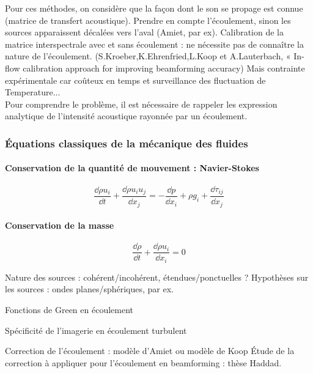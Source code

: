 Pour ces méthodes, on considère que la façon dont le son se propage est connue (matrice de transfert acoustique). Prendre en compte l'écoulement, sinon les sources apparaissent décalées vers l'aval (Amiet, par ex). 
Calibration de la matrice interspectrale avec et sans écoulement : ne nécessite pas de connaître la nature de l'écoulement. (S.Kroeber,K.Ehrenfried,L.Koop et A.Lauterbach, « In-flow calibration approach for improving beamforming accuracy) Mais contrainte expérimentale car coûteux en temps et surveillance des fluctuation de Temperature...\\


Pour comprendre le problème, il est nécessaire de rappeler les expression analytique de l'intensité acoustique rayonnée par un écoulement.

\subsubsection{Équations classiques de la mécanique des fluides}
\vspace{0.3cm}\paragraph{Conservation de la quantité de mouvement : Navier-Stokes}
\begin{equation}
	\frac{\dd \rho u_i}{\dd t} + \frac{\dd \rho u_i u_j}{\dd x_j} = -\frac{\dd p}{\dd x_i} + \rho g_i + \frac{\dd \tau_{ij}}{\dd x_j}
\end{equation}
\paragraph{Conservation de la masse}
\begin{equation}
 \frac{\dd \rho}{\dd t} + \frac{\dd \rho u_{i}}{\dd x_i} = 0
\end{equation}




Nature des sources : cohérent/incohérent, étendues/ponctuelles ? Hypothèses sur les sources : ondes planes/sphériques, par ex.

Fonctions de Green en écoulement

Spécificité de l'imagerie en écoulement turbulent

Correction de l'écoulement : modèle d'Amiet ou modèle de Koop
Étude de la correction à appliquer pour l'écoulement en beamforming : thèse Haddad.


